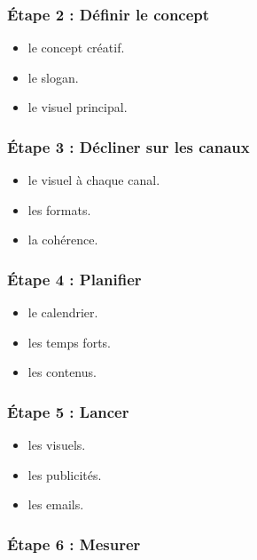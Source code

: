 \subsubsection{Étape 2 : Définir le concept}

\begin{itemize}
    \item {} le concept créatif.
    \item {} le slogan.
    \item {} le visuel principal.
\end{itemize}

\subsubsection{Étape 3 : Décliner sur les canaux}

\begin{itemize}
    \item {} le visuel à chaque canal.
    \item {} les formats.
    \item {} la cohérence.
\end{itemize}

\subsubsection{Étape 4 : Planifier}

\begin{itemize}
    \item {} le calendrier.
    \item {} les temps forts.
    \item {} les contenus.
\end{itemize}

\subsubsection{Étape 5 : Lancer}

\begin{itemize}
    \item {} les visuels.
    \item {} les publicités.
    \item {} les emails.
\end{itemize}

\subsubsection{Étape 6 : Mesurer}


